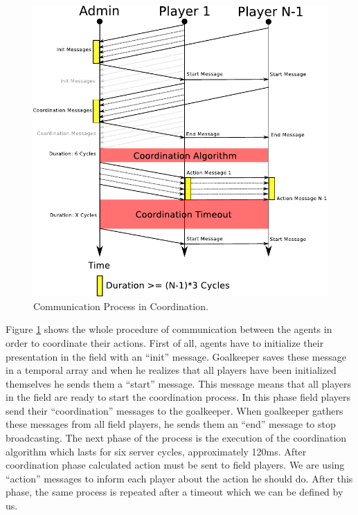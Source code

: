 \begin{figure}[htb!]
\centering
  \includegraphics[scale=1]{Chapter4/figures/CoordComm.pdf}
  \caption{Communication Process in Coordination.} 
  \label{fig:coordinationprocess}
\end{figure}
Figure \ref{fig:coordinationprocess} shows the whole procedure of communication between the agents in order to coordinate their actions. First of all, agents have to initialize their presentation in the field with an ``init'' message. Goalkeeper saves these message in a temporal array and when he realizes that all players have been initialized themselves he sends them a ``start'' message. This message means that all players in the field are ready to start the coordination process. In this phase field players send their ``coordination'' messages to the goalkeeper. When goalkeeper gathers these messages from all field players, he sends them an ``end'' message to stop broadcasting. The next phase of the process is the execution of the coordination algorithm which lasts for six server cycles, approximately 120ms. After coordination phase calculated action must be sent to field players. We are using ``action'' messages to inform each player about the action he should do. After this phase, the same process is repeated after a timeout which we can be defined by us.
